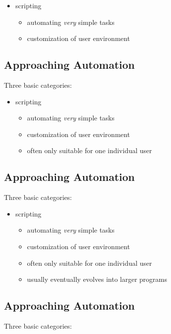 \documentclass[xga]{xdvislides}
\begin{document}
\begin{itemize}
	\item scripting
		\begin{itemize}
			\item automating {\em very} simple tasks
			\item customization of user environment
		\end{itemize}
\end{itemize}

\subsection{Approaching Automation}
Three basic categories:
\\

\begin{itemize}
	\item scripting
		\begin{itemize}
			\item automating {\em very} simple tasks
			\item customization of user environment
			\item often only suitable for one individual user
		\end{itemize}
\end{itemize}

\subsection{Approaching Automation}
Three basic categories:
\\

\begin{itemize}
	\item scripting
		\begin{itemize}
			\item automating {\em very} simple tasks
			\item customization of user environment
			\item often only suitable for one individual user
			\item usually eventually evolves into larger programs
		\end{itemize}
\end{itemize}


\subsection{Approaching Automation}
Three basic categories:
\\
\end{document}

